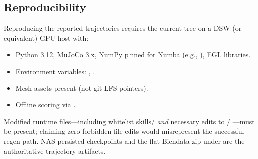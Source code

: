 \subsection{Reproducibility}
\label{sec:experiments:reproducibility}

Reproducing the reported trajectories requires the current  tree on a DSW (or equivalent) GPU host with:
\begin{itemize}[leftmargin=*,itemsep=2pt]
    \item Python 3.12, MuJoCo 3.x, NumPy pinned for Numba (e.g., ), EGL libraries.
    \item Environment variables: , .
    \item Mesh assets present (not git-LFS pointers).
    \item Offline scoring via .
\end{itemize}

Modified runtime files---including whitelist skills/ \emph{and} necessary edits to  / ---must be present; claiming zero forbidden-file edits would misrepresent the successful regen path. NAS-persisted checkpoints and the flat Biendata zip under  are the authoritative trajectory artifacts.
